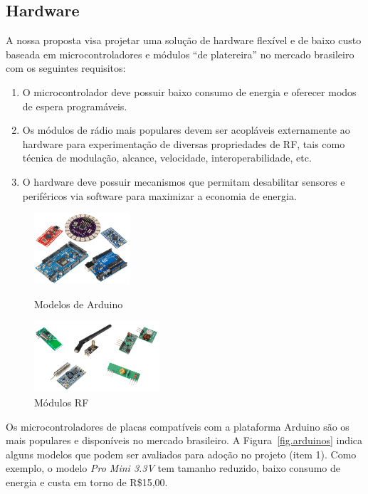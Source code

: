 \documentclass[titlepage,12pt]{article}
\begin{document}
\subsection{Hardware}

A nossa proposta visa projetar uma solução de hardware flexível e de baixo
custo baseada em microcontroladores e módulos ``de platereira'' no mercado
brasileiro com os seguintes requisitos:
%
\begin{enumerate}
\item O microcontrolador deve possuir baixo consumo de energia e oferecer
      modos de espera programáveis.
\item Os módulos de rádio mais populares devem ser acopláveis externamente ao
      hardware para experimentação de diversas propriedades de RF, tais como
      técnica de modulação, alcance, velocidade, interoperabilidade, etc.
\item O hardware deve possuir mecanismos que permitam desabilitar sensores e
      periféricos via software para maximizar a economia de energia.
\end{enumerate}

\begin{figure}
\begin{minipage}{0.50\textwidth}
\includegraphics[height=100px]{arduinos}
\caption{ Modelos de Arduino \label{fig.arduinos} }
\end{minipage}
\begin{minipage}{0.50\textwidth}
\includegraphics[height=100px]{rfs}
\caption{ Módulos RF \label{fig.rfs} }
\end{minipage}
\end{figure}

Os microcontroladores de placas compatíveis com a plataforma Arduino são os
mais populares e disponíveis no mercado brasileiro.
%
A Figura~\ref{fig.arduinos} indica alguns modelos que podem ser avaliados para
adoção no projeto (item 1).
%
Como exemplo, o modelo \emph{Pro Mini 3.3V} tem tamanho reduzido, baixo consumo
de energia e custa em torno de R\$15,00.
\end{document}
